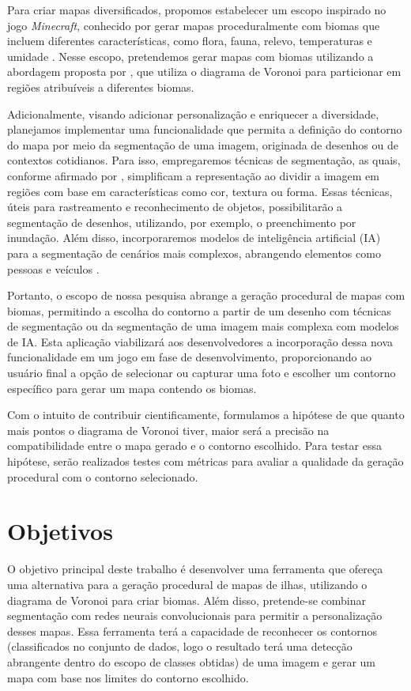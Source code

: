 Para criar mapas diversificados, propomos estabelecer um escopo inspirado no jogo \textit{Minecraft}, conhecido por gerar mapas proceduralmente com biomas que incluem diferentes características, como flora, fauna, relevo, temperaturas e umidade \cite{mojang}. Nesse escopo, pretendemos gerar mapas com biomas utilizando a abordagem proposta por , que utiliza o diagrama de Voronoi para particionar em regiões atribuíveis a diferentes biomas.

Adicionalmente, visando adicionar personalização e enriquecer a diversidade, planejamos implementar uma funcionalidade que permita a definição do contorno do mapa por meio da segmentação de uma imagem, originada de desenhos ou de contextos cotidianos. Para isso, empregaremos técnicas de segmentação, as quais, conforme afirmado por , simplificam a representação ao dividir a imagem em regiões com base em características como cor, textura ou forma. Essas técnicas, úteis para rastreamento e reconhecimento de objetos, possibilitarão a segmentação de desenhos, utilizando, por exemplo, o preenchimento por inundação. Além disso, incorporaremos modelos de inteligência artificial (IA) para a segmentação de cenários mais complexos, abrangendo elementos como pessoas e veículos \cite{saiwa, OpenCVFloodFill, dp_semantic_segmantation}.

Portanto, o escopo de nossa pesquisa abrange a geração procedural de mapas com biomas, permitindo a escolha do contorno a partir de um desenho com técnicas de segmentação ou da segmentação de uma imagem mais complexa com modelos de IA. Esta aplicação viabilizará aos desenvolvedores a incorporação dessa nova funcionalidade em um jogo em fase de desenvolvimento, proporcionando ao usuário final a opção de selecionar ou capturar uma foto e escolher um contorno específico para gerar um mapa contendo os biomas.

Com o intuito de contribuir cientificamente, formulamos a hipótese de que quanto mais pontos o diagrama de Voronoi tiver, maior será a precisão na compatibilidade entre o mapa gerado e o contorno escolhido. Para testar essa hipótese, serão realizados testes com métricas para avaliar a qualidade da geração procedural com o contorno selecionado.

\section{Objetivos}

O objetivo principal deste trabalho é desenvolver uma ferramenta que ofereça uma alternativa para a geração procedural de mapas de ilhas, utilizando o diagrama de Voronoi para criar biomas. Além disso, pretende-se combinar segmentação com redes neurais convolucionais para permitir a personalização desses mapas. Essa ferramenta terá a capacidade de reconhecer os contornos (classificados no conjunto de dados, logo o resultado terá uma detecção abrangente dentro do escopo de classes obtidas) de uma imagem e gerar um mapa com base nos limites do contorno escolhido.

